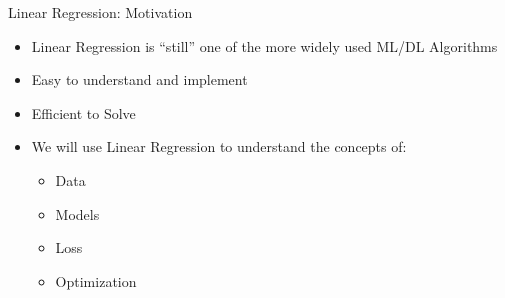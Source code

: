 \begin{frame}{Linear Regression: Motivation}
    \begin{itemize}
        \item Linear Regression is “still” one of the more widely used ML/DL Algorithms
        \item Easy to understand and implement
        \item Efficient to Solve
        \item We will use Linear Regression to understand the concepts of:
        \begin{itemize}
            \item Data
            \item Models
            \item Loss
            \item Optimization
        \end{itemize}
    \end{itemize}
\end{frame}
